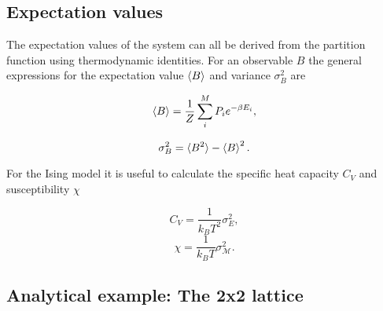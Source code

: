 \documentclass[11pt]{article}
\begin{document}
\subsection*{Expectation values}
\begin{flushleft}

The expectation values of the system can all be derived from the partition function using thermodynamic identities. For an observable $B$ the general expressions for the expectation value $\braket{B}$ and variance $\sigma_B^2$ are

\begin{equation}\label{expectation}
\braket{B} = \frac{1}{Z} \sum_i^M P_i e^{- \beta E_i},
\end{equation} 

\begin{equation}\label{variance}
\sigma_B^2 = \braket{B^2} - \braket{B}^2.
\end{equation}

For the Ising model it is useful to calculate the specific heat capacity $C_V$ and susceptibility $\chi$

\begin{equation}\label{Cv exp}
C_V = \frac{1}{k_B T^2} \sigma_E^2,
\end{equation}
\begin{equation}\label{X exp}
\chi = \frac{1}{k_B T} \sigma_{\mathcal{M}}^2.
\end{equation}



\end{flushleft}

\subsection{Analytical example: The 2x2 lattice}
\end{document}
